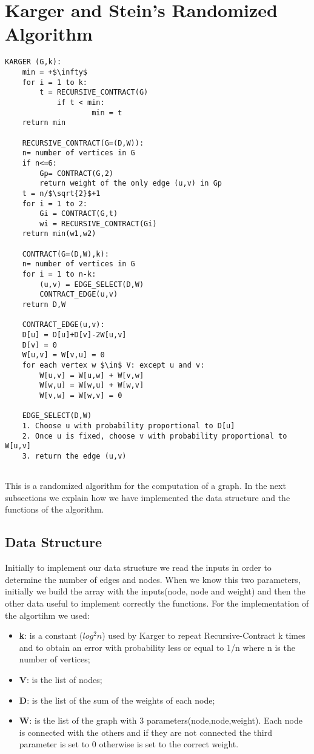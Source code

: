 \section{Karger and Stein's Randomized Algorithm}\label{karger}

\begin{lstlisting}[mathescape=true]
	KARGER (G,k):
	min = +$\infty$
	for i = 1 to k:		
		t = RECURSIVE_CONTRACT(G)		
			if t < min:
					min = t
	return min
	
	RECURSIVE_CONTRACT(G=(D,W)):
	n= number of vertices in G
	if n<=6:
		Gp= CONTRACT(G,2)
		return weight of the only edge (u,v) in Gp
	t = n/$\sqrt{2}$+1
	for i = 1 to 2:
		Gi = CONTRACT(G,t)
		wi = RECURSIVE_CONTRACT(Gi)
	return min(w1,w2)
	
	CONTRACT(G=(D,W),k):
	n= number of vertices in G
	for i = 1 to n-k:
		(u,v) = EDGE_SELECT(D,W)
		CONTRACT_EDGE(u,v)
	return D,W
	
	CONTRACT_EDGE(u,v):
	D[u] = D[u]+D[v]-2W[u,v]
	D[v] = 0
	W[u,v] = W[v,u] = 0
	for each vertex w $\in$ V: except u and v:
		W[u,v] = W[u,w] + W[v,w]
		W[w,u] = W[w,u] + W[w,v]
		W[v,w] = W[w,v] = 0
		
	EDGE_SELECT(D,W)
	1. Choose u with probability proportional to D[u]
	2. Once u is fixed, choose v with probability proportional to W[u,v]
	3. return the edge (u,v)
	
\end{lstlisting}

This is a randomized algorithm for the computation of a graph.
In the next subsections we explain how we have implemented the data structure and the functions of the algorithm.

\pagebreak

\subsection{Data Structure}
Initially to implement our data structure we read the inputs in order to determine the number of edges and nodes.
When we know this two parameters, initially we build the array with the inputs(node, node and weight) and then the other data useful to implement correctly the functions.
For the implementation of the algortihm we used:
\begin{itemize}
	\item  \textbf{k}: is a constant ($log^2n$) used by Karger to repeat Recursive-Contract k times and to obtain an error with probability less or equal to 1/n where n is the number of vertices;
	\item  \textbf{V}: is the list of nodes;
	\item  \textbf{D}: is the list of the sum of the weights of each node;
	\item  \textbf{W}: is the list of the graph with 3 parameters(node,node,weight). Each node is connected with the others and if they are not connected the third parameter is set to 0 otherwise is set to the correct weight.
\end{itemize}


